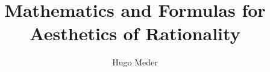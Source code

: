 
\title{Mathematics and Formulas for Aesthetics of Rationality}
\author{Hugo Meder}

\maketitle
\tableofcontents









